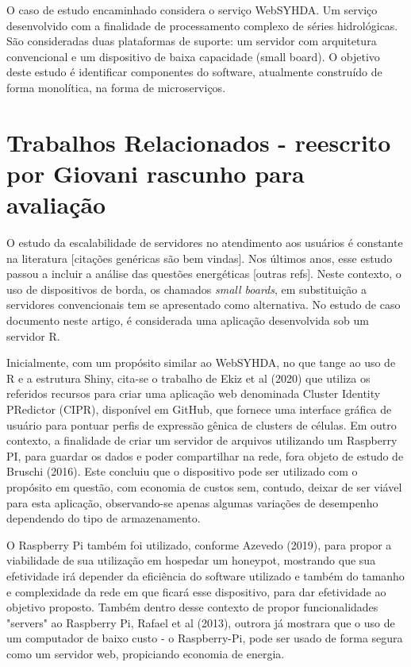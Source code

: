 \documentclass[12pt,english,brazil]{article}
\begin{document}
O caso de estudo encaminhado considera o serviço WebSYHDA. Um serviço desenvolvido com a finalidade de processamento complexo de séries hidrológicas. São consideradas duas plataformas de suporte: um servidor com arquitetura convencional e um dispositivo de baixa capacidade (small board). O objetivo deste estudo é identificar componentes do software, atualmente construído de forma monolítica, na forma de microserviços.

\section{Trabalhos Relacionados  - reescrito por Giovani rascunho para avaliação} \label{sec:TrabalhosRelacionados}

O estudo da escalabilidade de servidores no atendimento aos usuários é constante na literatura [citações
genéricas são bem vindas]. Nos últimos anos, esse estudo passou a incluir a análise das questões
energéticas [outras refs]. Neste contexto, o uso de dispositivos de borda, os chamados \emph{small
boards}, em substituição a servidores convencionais tem se apresentado como alternativa. No estudo de caso documento neste artigo, é considerada uma aplicação desenvolvida sob um servidor R.

Inicialmente, com um propósito similar ao WebSYHDA, no que tange ao uso de R e a estrutura Shiny, cita-se o  trabalho de Ekiz et al (2020) que utiliza os referidos recursos para criar uma aplicação web denominada Cluster Identity PRedictor (CIPR), disponível em GitHub, que fornece uma interface gráfica de usuário para pontuar perfis de expressão gênica de clusters de células.
Em outro contexto, a finalidade de criar um servidor de arquivos utilizando um Raspberry PI, para guardar os dados e poder compartilhar na rede, fora objeto de estudo de Bruschi (2016). Este concluiu que o dispositivo pode ser utilizado com o propósito em questão, com economia de custos sem, contudo, deixar de ser viável para esta aplicação, observando-se apenas algumas variações de desempenho dependendo do tipo de armazenamento.

O Raspberry Pi também foi utilizado, conforme Azevedo (2019), para propor a viabilidade de sua utilização em hospedar um honeypot, mostrando que sua efetividade irá depender da eficiência do software utilizado e também do tamanho e complexidade da rede em que ficará esse dispositivo, para dar efetividade ao objetivo proposto. Também dentro desse contexto de propor funcionalidades "servers" ao Raspberry Pi, Rafael et al (2013), outrora já mostrara que o uso de um computador de baixo custo - o Raspberry-Pi, pode ser usado de forma segura como um servidor web,  propiciando economia de energia.
\end{document}
